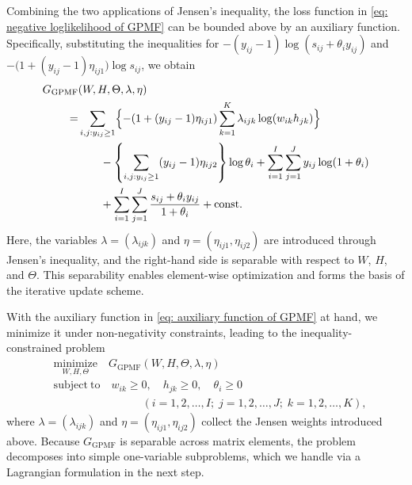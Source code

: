 \documentclass[pdflatex,sn-basic]{sn-jnl}%
\theoremstyle{thmstyleone}%
\theoremstyle{thmstyletwo}%
\theoremstyle{thmstylethree}%
\begin{document}
Combining the two applications of Jensen's inequality, the loss function in \eqref{eq: negative loglikelihood of GPMF} can be bounded above by an auxiliary function.  
Specifically, substituting the inequalities for 
$-(y_{ij}-1)\log(s_{ij}+\theta_i y_{ij})$ and 
$-\bigl(1+(y_{ij}-1)\eta_{ij1}\bigr)\log s_{ij}$, 
we obtain
\begin{align}
	G_{\mathrm{GPMF}}&(W,H,\Theta,\lambda,\eta) \nonumber \\
	=& \sum_{i,j:y_{ij}\ge1}\Bigl\{-(1+(y_{ij}-1)\eta_{ij1})\sum_{k=1}^{K}\lambda_{ijk}\log(w_{ik}h_{jk})\Bigr\} \nonumber \\
	&\hspace*{2em}-\left\{\sum_{i,j:y_{ij}\ge1}(y_{ij}-1)\eta_{ij2}\right\}\log\theta_i
	+\sum_{i=1}^{I}\sum_{j=1}^{J}y_{ij}\log(1+\theta_i) \nonumber \\
	&\hspace*{2em}+\sum_{i=1}^{I}\sum_{j=1}^{J}\frac{s_{ij}+\theta_i y_{ij}}{1+\theta_i}
	+ \mathrm{const.} \label{eq: auxiliary function of GPMF}
\end{align}
Here, the variables $\lambda=(\lambda_{ijk})$ and $\eta=(\eta_{ij1},\eta_{ij2})$ are introduced through Jensen’s inequality, and the right-hand side is separable with respect to $W$, $H$, and $\Theta$.  
This separability enables element-wise optimization and forms the basis of the iterative update scheme.

With the auxiliary function in \eqref{eq: auxiliary function of GPMF} at hand, we minimize it under non-negativity constraints, leading to the inequality-constrained problem
\begin{align}
	&\underset{W,H,\Theta}{\mathrm{minimize}}\quad G_{\mathrm{GPMF}}(W,H,\Theta,\lambda,\eta) \nonumber\\
	&\mathrm{subject\ to}\quad w_{ik}\ge0,\quad h_{jk}\ge0,\quad \theta_i\ge0 \nonumber\\
	&\qquad\qquad\qquad\qquad (i=1, 2, \dots,I;\; j=1, 2, \dots,J;\; k=1, 2, \dots,K), \label{min_GPMF}
\end{align}
where $\lambda=(\lambda_{ijk})$ and $\eta=(\eta_{ij1},\eta_{ij2})$ collect the Jensen weights introduced above. Because $G_{\mathrm{GPMF}}$ is separable across matrix elements, the problem decomposes into simple one-variable subproblems, which we handle via a Lagrangian formulation in the next step.
\end{document}

